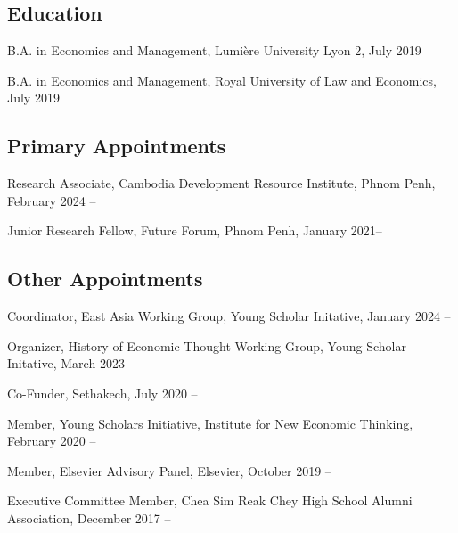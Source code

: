 \documentclass[10pt,a4paper]{article}
\begin{document}
\subsection*{Education}


	B.A. in Economics and Management, Lumière University Lyon 2, July 2019 
	
	B.A. in Economics and Management, Royal University of Law and Economics, July 2019



\subsection*{Primary Appointments}	


		Research Associate, Cambodia Development Resource Institute, Phnom Penh,  February 2024 --
		
		Junior Research Fellow, Future Forum, Phnom Penh,  January 2021-- 


\subsection*{Other Appointments}
	
	Coordinator, East Asia Working Group, Young Scholar Initative, January 2024 --
	
	Organizer, History of Economic Thought Working Group, Young Scholar Initative, March 2023 --
	
	Co-Funder, Sethakech, July 2020 --
	
	Member, Young Scholars Initiative, Institute for New Economic Thinking, February 2020 --

	Member, Elsevier Advisory Panel, Elsevier, October 2019 --
	
	Executive Committee Member, Chea Sim Reak Chey High School Alumni Association, December 2017 --

	
\end{document}
